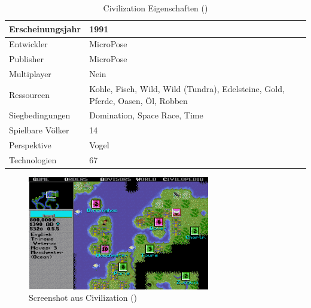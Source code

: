 \begin{table}[]
    \centering
    \caption{Civilization Eigenschaften (\cite*[]{civallcompare,civigdb,civwin, civ:ressources})}
    \label{table:civ}
    \begin{tabular}{|l|l|}
    \hline
    Erscheinungsjahr & 1991                                                                           \\ \hline
    Entwickler       & MicroPose                                                                      \\ \hline
    Publisher        & MicroPose                                                                      \\ \hline
    Multiplayer      & Nein                                                                      \\ \hline
    Ressourcen       & Kohle, Fisch, Wild, Wild (Tundra), Edelsteine, Gold, Pferde, Oasen, Öl, Robben \\ \hline
    Siegbedingungen  & Domination, Space Race, Time                                                   \\ \hline
    Spielbare Völker & 14                                                                             \\ \hline
    Perspektive      & Vogel                                                                          \\ \hline
    Technologien     & 67                                                                             \\ \hline
    \end{tabular}
\end{table}

\begin{figure}
    \begin{center}
        \includegraphics[width=300px]{0.bilder/civ.png}
    \end{center}
    \caption{Screenshot aus Civilization (\cite{civigdb})} \label{image:civ}
\end{figure}